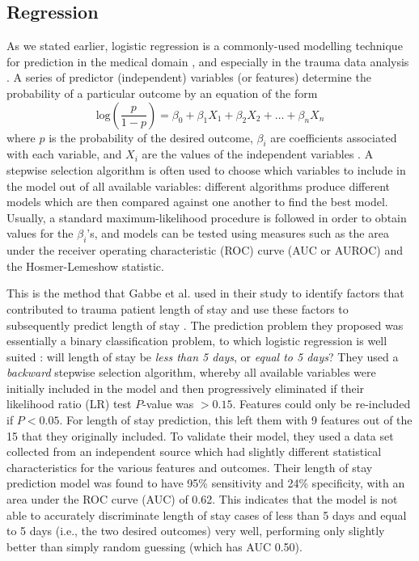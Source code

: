 \subsection{Regression}
As we stated earlier, logistic regression is a commonly-used modelling
technique for prediction in the medical domain \citep{Tu1996}, and especially
in the trauma data analysis \citep{Gabbe2005}. A series of
predictor (independent) variables (or features) determine the probability of a
particular outcome by an equation of the form
\begin{equation*}
\mathrm{log}\left(\frac{p}{1-p}\right) = \beta_0 + \beta_1X_1 + \beta_2X_2 + \dots + \beta_nX_n
\end{equation*}
where $p$ is the probability of the desired outcome, $\beta_i$ are coefficients
associated with each variable, and $X_i$ are the values of the independent
variables \citep{Hosmer1989}. A stepwise selection algorithm is often used to
choose which variables to include in the model out of all available variables:
different algorithms produce different models which are then compared against
one another to find the best model. Usually, a standard maximum-likelihood
procedure is followed in order to obtain values for the $\beta_i$'s, and models
can be tested using measures such as the area under the receiver operating
characteristic (ROC) curve (AUC or AUROC) and the Hosmer-Lemeshow statistic.

This is the method that Gabbe et al. used in their study to identify factors
that contributed to trauma patient length of stay and use these factors to
subsequently predict length of stay \citep{Gabbe2005}. The prediction problem
they proposed was essentially a binary classification problem, to which
logistic regression is well suited \citep{Tu1996}: will length of stay be
\textit{less than 5 days}, or \textit{equal to 5 days}? They used a
\textit{backward} stepwise selection algorithm, whereby all available variables
were initially included in the model and then progressively eliminated if their
likelihood ratio (LR) test $P$-value was $>0.15$. Features could only be
re-included if $P<0.05$. For length of stay
prediction, this left them with 9 features out of the 15 that they originally
included. To validate their model, they used a data set collected from an
independent source which had slightly different statistical characteristics for
the various features and outcomes. Their length of stay prediction model was
found to have 95\% sensitivity and 24\% specificity, with an area under the ROC
curve (AUC) of 0.62. This indicates that the model is not able to accurately
discriminate
length of stay cases of less than 5 days and equal to 5 days (i.e., the two
desired outcomes) very well, performing only
slightly better than simply random guessing (which has AUC 0.50).

